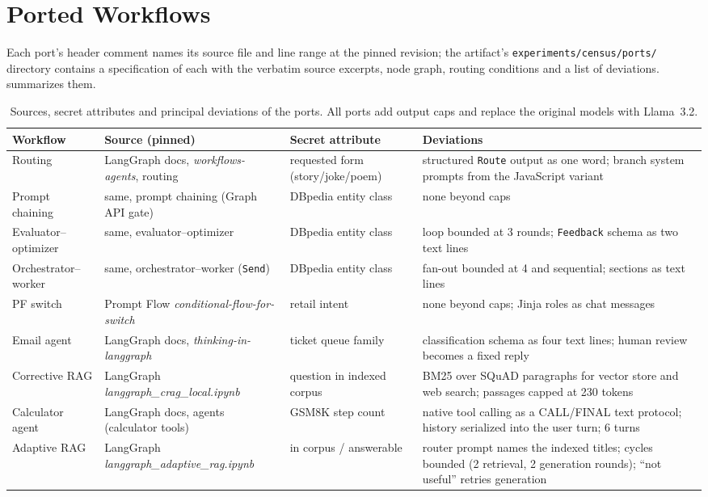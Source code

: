 \section{Ported Workflows}\label{app:ports}

Each port's header comment names its source file and line range at the pinned revision; the artifact's \texttt{experiments/census/ports/} directory contains a specification of each with the verbatim source excerpts, node graph, routing conditions and a list of deviations.  summarizes them.

\begin{table}[h]
\caption{Sources, secret attributes and principal deviations of the ports. All ports add output caps and replace the original models with Llama~3.2.}
\label{tab:ports}
\footnotesize
\begin{tabular}{p{2.4cm}p{3.6cm}p{2.6cm}p{4.6cm}}
\toprule
Workflow & Source (pinned) & Secret attribute & Deviations \\
\midrule
Routing & LangGraph docs, \emph{workflows-agents}, routing & requested form (story/joke/poem) & structured \texttt{Route} output as one word; branch system prompts from the JavaScript variant \\
Prompt chaining & same, prompt chaining (Graph API gate) & DBpedia entity class & none beyond caps \\
Evaluator--optimizer & same, evaluator--optimizer & DBpedia entity class & loop bounded at 3 rounds; \texttt{Feedback} schema as two text lines \\
Orchestrator--worker & same, orchestrator--worker (\texttt{Send}) & DBpedia entity class & fan-out bounded at 4 and sequential; sections as text lines \\
PF switch & Prompt Flow \emph{conditional-flow-for-switch} & retail intent & none beyond caps; Jinja roles as chat messages \\
Email agent & LangGraph docs, \emph{thinking-in-langgraph} & ticket queue family & classification schema as four text lines; human review becomes a fixed reply \\
Corrective RAG & LangGraph \emph{langgraph\_crag\_local.ipynb} & question in indexed corpus & BM25 over SQuAD paragraphs for vector store and web search; passages capped at 230 tokens \\
Calculator agent & LangGraph docs, agents (calculator tools) & GSM8K step count & native tool calling as a CALL/FINAL text protocol; history serialized into the user turn; 6 turns \\
Adaptive RAG & LangGraph \emph{langgraph\_adaptive\_rag.ipynb} & in corpus / answerable & router prompt names the indexed titles; cycles bounded (2 retrieval, 2 generation rounds); ``not useful'' retries generation \\
\bottomrule
\end{tabular}
\end{table}

